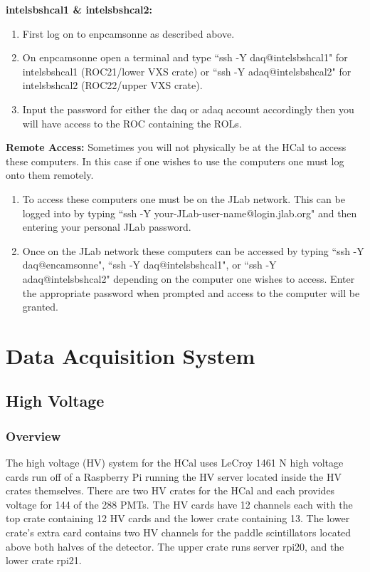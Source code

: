 \documentclass[oneside]{book}   %
\begin{document}
\textbf{\large{intelsbshcal1 \& intelsbshcal2:}}
\begin{enumerate}
	\item First log on to enpcamsonne as described above.
	\item On enpcamsonne open a terminal and type ``ssh -Y daq@intelsbshcal1" for intelsbshcal1 (ROC21/lower VXS crate) or ``ssh -Y adaq@intelsbshcal2" for intelsbshcal2 (ROC22/upper VXS crate).
	\item Input the password for either the daq or adaq account accordingly then you will have access to the ROC containing the ROLs.
\end{enumerate}

\textbf{\large{Remote Access:}}
Sometimes you will not physically be at the HCal to access these computers. In this case if one wishes to use the computers one must log onto them remotely.

\begin{enumerate}
	\item To access these computers one must be on the JLab network. This can be logged into by typing ``ssh -Y your-JLab-user-name@login.jlab.org" and then entering your personal JLab password. 
	\item Once on the JLab network these computers can be accessed by typing ``ssh -Y daq@encamsonne", ``ssh -Y  daq@intelsbshcal1", or ``ssh -Y  adaq@intelsbshcal2" depending on the computer one wishes to access. Enter the appropriate password when prompted and access to the computer will be granted.
\end{enumerate}


\chapter{Data Acquisition System}
\label{ch:daq}
\section{High Voltage}
\label{sec:hv}

\subsection{Overview}
\label{ssec:hv_overview}

The high voltage (HV) system for the HCal uses LeCroy 1461 N high voltage cards run off of a Raspberry Pi running the HV server located inside the HV crates themselves. There are two HV crates for the HCal and each provides voltage for 144 of the 288 PMTs. The HV cards have 12 channels each with the top crate containing 12 HV cards and the lower crate containing 13. The lower crate's extra card contains two HV channels for the paddle scintillators located above both halves of the detector. The upper crate runs server rpi20, and the lower crate rpi21. 
\end{document}
